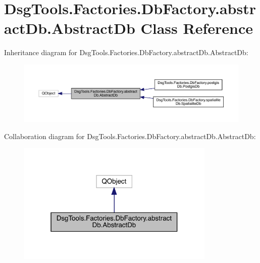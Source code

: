 \hypertarget{class_dsg_tools_1_1_factories_1_1_db_factory_1_1abstract_db_1_1_abstract_db}{}\section{Dsg\+Tools.\+Factories.\+Db\+Factory.\+abstract\+Db.\+Abstract\+Db Class Reference}
\label{class_dsg_tools_1_1_factories_1_1_db_factory_1_1abstract_db_1_1_abstract_db}


Inheritance diagram for Dsg\+Tools.\+Factories.\+Db\+Factory.\+abstract\+Db.\+Abstract\+Db\+:
\nopagebreak
\begin{figure}[H]
\begin{center}
\leavevmode
\includegraphics[width=350pt]{class_dsg_tools_1_1_factories_1_1_db_factory_1_1abstract_db_1_1_abstract_db__inherit__graph}
\end{center}
\end{figure}


Collaboration diagram for Dsg\+Tools.\+Factories.\+Db\+Factory.\+abstract\+Db.\+Abstract\+Db\+:
\nopagebreak
\begin{figure}[H]
\begin{center}
\leavevmode
\includegraphics[width=268pt]{class_dsg_tools_1_1_factories_1_1_db_factory_1_1abstract_db_1_1_abstract_db__coll__graph}
\end{center}
\end{figure}
